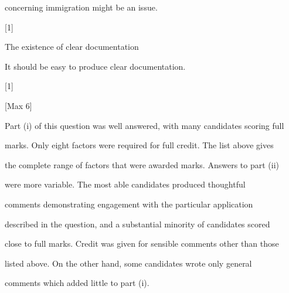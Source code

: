 \documentclass[a4paper,12pt]{article}
\begin{document}
concerning immigration might be an issue.

[1]

The existence of clear documentation

It should be easy to produce clear documentation.

[1]

[Max 6]
\newpage
[Total 10]

Part (i) of this question was well answered, with many candidates scoring full

marks. Only eight factors were required for full credit. The list above gives

the complete range of factors that were awarded marks. Answers to part (ii)

were more variable. The most able candidates produced thoughtful

comments demonstrating engagement with the particular application

described in the question, and a substantial minority of candidates scored

close to full marks. Credit was given for sensible comments other than those

listed above. On the other hand, some candidates wrote only general

comments which added little to part (i).
\end{document}
